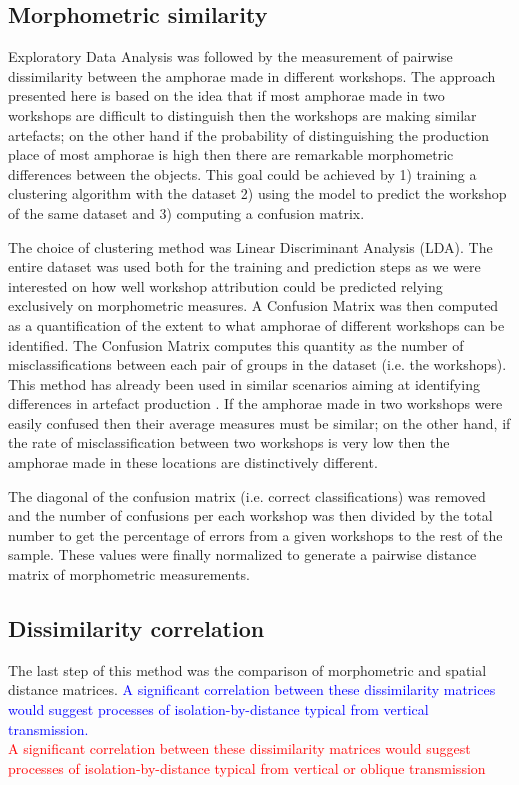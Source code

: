 \documentclass[review]{elsarticle}
\newcommand{\memo}[2]{\textcolor{#1}{#2}}
\newcommand{\maria}[1]{\memo{red}{#1\\}}
\newcommand{\revise}[1]{\memo{blue}{#1\\}}
\begin{document}
\subsection{Morphometric similarity} 

Exploratory Data Analysis was followed by the measurement of pairwise dissimilarity between the amphorae made in different workshops. The approach presented here is based on the idea that if most amphorae made in two workshops are difficult to distinguish then the workshops are making similar artefacts; on the other hand if the probability of distinguishing the production place of most amphorae is high then there are remarkable morphometric differences between the objects. This goal could be achieved by 1) training a clustering algorithm with the dataset 2) using the model to predict the workshop of the same dataset and 3) computing a confusion matrix.

The choice of clustering method was Linear Discriminant Analysis (LDA). The entire dataset was used both for the training and prediction steps as we were interested on how well workshop attribution could be predicted relying exclusively on morphometric measures. A Confusion Matrix was then computed as a quantification of the extent to what amphorae of different workshops can be identified. The Confusion Matrix computes this quantity as the number of misclassifications between each pair of groups in the dataset (i.e. the workshops). This method has already been used in similar scenarios aiming at identifying differences in artefact production \citep{charlton_investigating_2012, thorpe_distribution_1984,i_martin_alisis_1998}. If the amphorae made in two workshops were easily confused then their average measures must be similar; on the other hand, if the rate of misclassification between two workshops is very low then the amphorae made in these locations are distinctively different.

The diagonal of the confusion matrix (i.e. correct classifications) was removed and the number of confusions per each workshop was then divided by the total number to get the percentage of errors from a given workshops to the rest of the sample. These values were finally normalized to generate a pairwise distance matrix of morphometric measurements.

\subsection{Dissimilarity correlation}
The last step of this method was the comparison of morphometric and spatial distance matrices. 
\revise{A significant correlation between these dissimilarity matrices would suggest processes of isolation-by-distance typical from vertical transmission.}
\maria{A significant correlation between these dissimilarity matrices would suggest processes of isolation-by-distance typical from vertical or oblique transmission}
\end{document}
